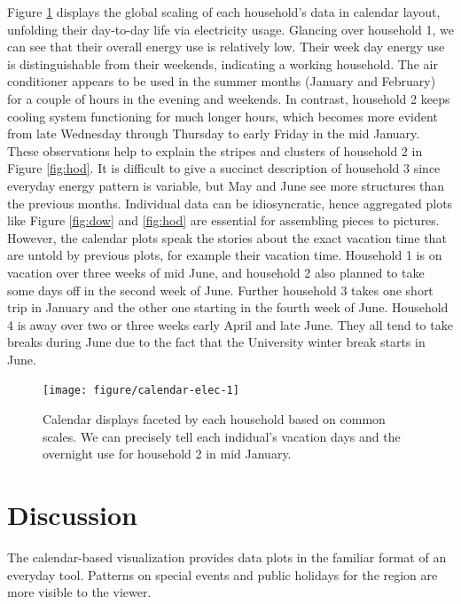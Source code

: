 \documentclass[12pt]{article}
\begin{document}
Figure \ref{fig:calendar-elec} displays the global scaling of each household's data in calendar layout, unfolding their day-to-day life via electricity usage. Glancing over household 1, we can see that their overall energy use is relatively low. Their week day energy use is distinguishable from their weekends, indicating a working household. The air conditioner appears to be used in the summer months (January and February) for a couple of hours in the evening and weekends. In contrast, household 2 keeps cooling system functioning for much longer hours, which becomes more evident from late Wednesday through Thursday to early Friday in the mid January. These observations help to explain the stripes and clusters of household 2 in Figure \ref{fig:hod}. It is difficult to give a succinct description of household 3 since everyday energy pattern is variable, but May and June see more structures than the previous months. Individual data can be idiosyncratic, hence aggregated plots like Figure \ref{fig:dow} and \ref{fig:hod} are essential for assembling pieces to pictures. However, the calendar plots speak the stories about the exact vacation time that are untold by previous plots, for example their vacation time. Household 1 is on vacation over three weeks of mid June, and household 2 also planned to take some days off in the second week of June. Further household 3 takes one short trip in January and the other one starting in the fourth week of June. Household 4 is away over two or three weeks early April and late June. They all tend to take breaks during June due to the fact that the University winter break starts in June.

\begin{figure}

{\centering \texttt{[image: figure/calendar-elec-1]} 

}

\caption{Calendar displays faceted by each household based on common scales. We can precisely tell each indidual's vacation days and the overnight use for household 2 in mid January.}\label{fig:calendar-elec}
\end{figure}

\hypertarget{sec:discussion}{%
\section{Discussion}\label{sec:discussion}}

The calendar-based visualization provides data plots in the familiar format of an everyday tool. Patterns on special events and public holidays for the region are more visible to the viewer.
\end{document}
